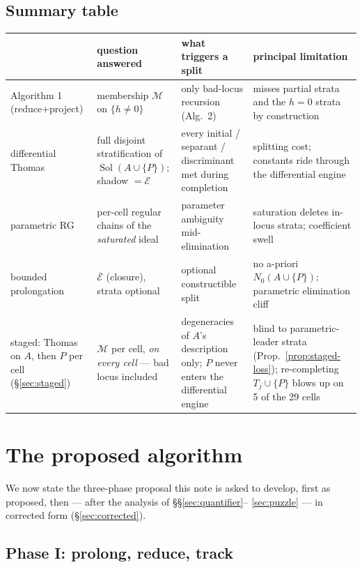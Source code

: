 \documentclass[11pt]{article}
\newcommand{\Mem}{\mathcal{M}}
\newcommand{\Ex}{\mathcal{E}}
\DeclareMathOperator{\Sol}{Sol}
\begin{document}
\subsection{Summary table}

\begin{center}
\small
\begin{tabular}{p{2.9cm}p{3.4cm}p{3.6cm}p{3.6cm}}
\toprule
 & question answered & what triggers a split & principal limitation \\
\midrule
Algorithm 1 (reduce{+}project) & membership $\Mem$ on $\{h\ne0\}$ &
  only bad-locus recursion (Alg.~2) & misses partial strata and the
  $h=0$ strata by construction \\
differential Thomas & full disjoint stratification of
  $\Sol(A\cup\{P\})$; shadow $=\Ex$ & every initial / separant /
  discriminant met during completion & splitting cost; constants ride
  through the differential engine \\
parametric RG & per-cell regular chains of the \emph{saturated} ideal &
  parameter ambiguity mid-elimination & saturation deletes in-locus
  strata; coefficient swell \\
bounded prolongation & $\overline{\Ex}$ (closure), strata optional &
  optional constructible split & no a-priori $N_0(A\cup\{P\})$;
  parametric elimination cliff \\
staged: Thomas on $A$, then $P$ per cell (\S\ref{sec:staged}) &
  $\Mem$ per cell, \emph{on every cell} --- bad locus included &
  degeneracies of $A$'s description only; $P$ never enters the
  differential engine & blind to parametric-leader strata
  (Prop.~\ref{prop:staged-loss}); re-completing $T_j\cup\{P\}$ blows up on
  5 of the 29 cells \\
\bottomrule
\end{tabular}
\end{center}

\section{The proposed algorithm}
\label{sec:algorithm}

We now state the three-phase proposal this note is asked to develop, first as
proposed, then --- after the analysis of \S\S\ref{sec:quantifier}--%
\ref{sec:puzzle} --- in corrected form (\S\ref{sec:corrected}).

\subsection{Phase I: prolong, reduce, track}
\end{document}

